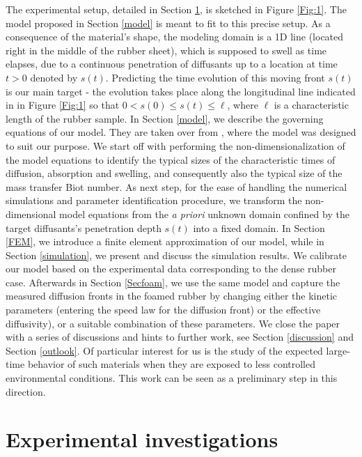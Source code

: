 \documentclass{article}
\begin{document}
The experimental setup, detailed in Section \ref{lab}, is sketched in Figure \ref{Fig:1}. The model proposed in Section \ref{model} is meant to fit to this precise setup. As a consequence of the material's shape, the modeling domain is a 1D line (located right in the middle of the rubber sheet), which is supposed to swell as time elapses, due to a continuous penetration of diffusants up to a location at time $t>0$ denoted by $s(t)$. Predicting the time evolution of this moving front $s(t)$ is our main target - the evolution takes place along the longitudinal line indicated in in Figure \ref{Fig:1} so that  $0<s(0)\leq s(t)\leq \ell$, where $\ell$ is a characteristic length of the rubber sample.
In Section \ref{model}, we  describe the governing equations of our model. They are taken over from \cite{kumazaki2020global}, where the model was designed to suit our purpose. We start off with performing the non-dimensionalization of the model equations to identify the typical sizes of the characteristic times of diffusion, absorption and swelling, and consequently also the typical size of the mass transfer Biot number. As next step, for the ease of handling the numerical simulations and parameter identification procedure, we transform  the non-dimensional model equations from the {\em a priori} unknown  domain confined by the target diffusants's penetration depth $s(t)$ into a fixed domain.
In Section \ref{FEM}, we introduce a finite element approximation of our model, while  in Section \ref{simulation}, we
present and discuss the simulation results. We calibrate our model based on the experimental data corresponding to the dense rubber case. Afterwards in Section \ref{Secfoam}, we use the same model and capture the measured diffusion fronts in the foamed rubber by changing either the kinetic parameters (entering the speed law for the diffusion front) or the effective diffusivity), or a suitable combination of these parameters.  We close the paper with a series of discussions and hints to further work, see Section \ref{discussion} and Section \ref{outlook}. Of particular interest for us is the study of the expected large-time behavior of such materials when they are exposed to less controlled environmental conditions. This work can be seen as a preliminary step in this direction.

\section{Experimental investigations}\label{lab}
\end{document}
